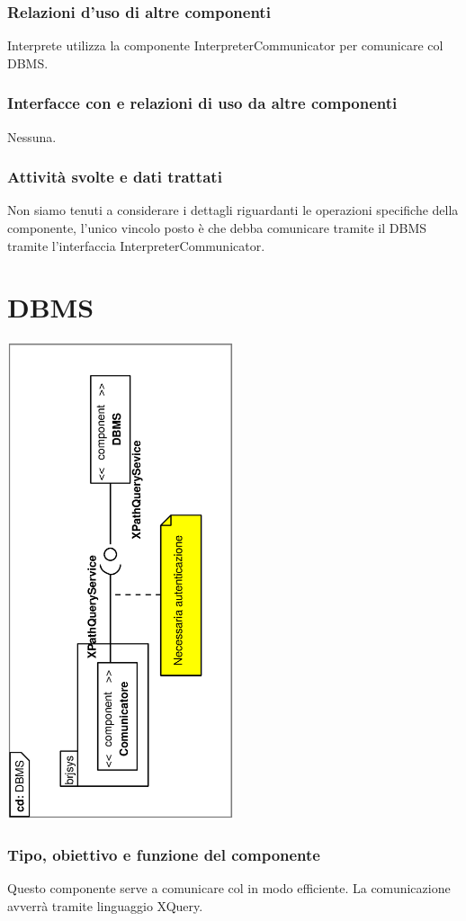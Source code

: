 \documentclass[11pt,titlepage,a4paper]{report}
\begin{document}
\subsubsection{Relazioni d'uso di altre componenti}
Interprete utilizza la componente InterpreterCommunicator per comunicare col DBMS.
\subsubsection{Interfacce con e relazioni di uso da altre componenti}
Nessuna.
\subsubsection{Attivit\`a svolte e dati trattati}
Non siamo tenuti a considerare i dettagli riguardanti le operazioni specifiche della componente, l'unico vincolo posto \`e che debba comunicare tramite il DBMS tramite l'interfaccia InterpreterCommunicator.
\section{DBMS}
\begin{center}
 \includegraphics[width=0.5\textwidth, angle=-90]{DiagrammaClassi/DBMS.eps}
\end{center}
\subsubsection{Tipo, obiettivo e funzione del componente}
Questo componente serve a comunicare col \re  in modo efficiente. La comunicazione avverr\`a tramite linguaggio XQuery.
\end{document}
